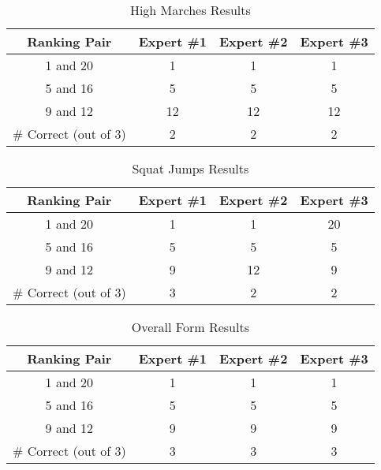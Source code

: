 \begin{table}[h!]
\caption{High Marches Results}
\centering
\begin{tabular}{c c c c}
\hline \hline
Ranking Pair & Expert \#1 & Expert \#2 & Expert \#3 \\ [0.5ex]
\hline
1 and 20 &		1&		1&		1 \\
5 and 16 &		5&		5&		5 \\
9 and 12 &		12&		12&		12 \\
\hline
\# Correct (out of 3)&		2&		2&		2 \\
\end{tabular}
\label{table:highmarchesresult}
\end{table}

\begin{table}[h!]
\caption{Squat Jumps Results}
\centering
\begin{tabular}{c c c c}
\hline \hline
Ranking Pair & Expert \#1 & Expert \#2 & Expert \#3 \\ [0.5ex]
\hline
1 and 20 &		1&		1&		20 \\
5 and 16 &		5&		5&		5 \\
9 and 12 &		9&		12&		9 \\
\hline
\# Correct (out of 3)&		3&		2&		2 \\
\end{tabular}
\label{table:squatjumpsresult}
\end{table}

\begin{table}[h!]
\caption{Overall Form Results}
\centering
\begin{tabular}{c c c c}
\hline \hline
Ranking Pair & Expert \#1 & Expert \#2 & Expert \#3 \\ [0.5ex]
\hline
1 and 20 &		1&		1&		1 \\
5 and 16 &		5&		5&		5 \\
9 and 12 &		9&		9&		9 \\
\hline
\# Correct (out of 3)&		3&		3&		3 \\
\end{tabular}
\label{table:overallformresult}
\end{table}